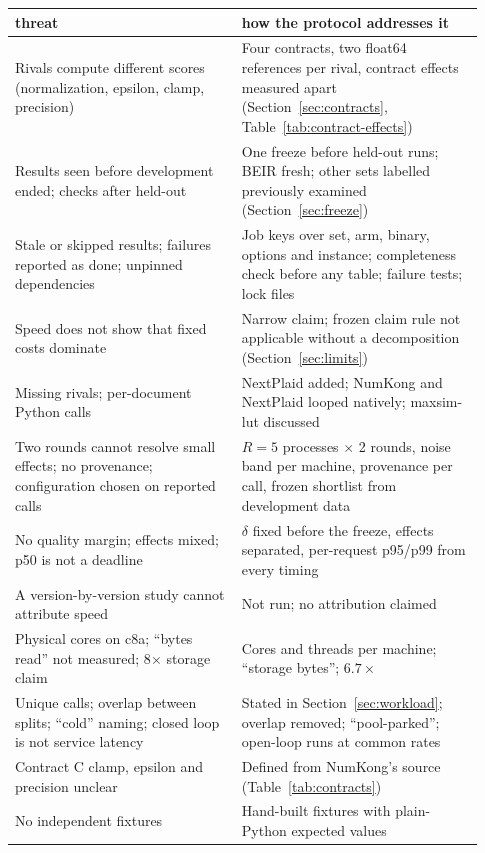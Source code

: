 \begin{small}
\begin{longtable}{p{0.45\linewidth}p{0.48\linewidth}}
\toprule
threat & how the protocol addresses it \\
\midrule
\endhead
Rivals compute different scores (normalization, epsilon, clamp, precision) & Four contracts, two float64 references per rival, contract effects measured apart (Section~\ref{sec:contracts}, Table~\ref{tab:contract-effects}) \\
Results seen before development ended; checks after held-out & One freeze before held-out runs; BEIR fresh; other sets labelled previously examined (Section~\ref{sec:freeze}) \\
Stale or skipped results; failures reported as done; unpinned dependencies & Job keys over set, arm, binary, options and instance; completeness check before any table; failure tests; lock files \\
Speed does not show that fixed costs dominate & Narrow claim; frozen claim rule not applicable without a decomposition (Section~\ref{sec:limits}) \\
Missing rivals; per-document Python calls & NextPlaid added; NumKong and NextPlaid looped natively; maxsim-lut discussed \\
Two rounds cannot resolve small effects; no provenance; configuration chosen on reported calls & $R = 5$ processes $\times$ 2 rounds, noise band per machine, provenance per call, frozen shortlist from development data \\
No quality margin; effects mixed; p50 is not a deadline & $\delta$ fixed before the freeze, effects separated, per-request p95/p99 from every timing \\
A version-by-version study cannot attribute speed & Not run; no attribution claimed \\
Physical cores on c8a; ``bytes read'' not measured; 8$\times$ storage claim & Cores and threads per machine; ``storage bytes''; $6.7\times$ \\
Unique calls; overlap between splits; ``cold'' naming; closed loop is not service latency & Stated in Section~\ref{sec:workload}; overlap removed; ``pool-parked''; open-loop runs at common rates \\
Contract C clamp, epsilon and precision unclear & Defined from NumKong's source (Table~\ref{tab:contracts}) \\
No independent fixtures & Hand-built fixtures with plain-Python expected values \\

\end{longtable}
\end{small}
